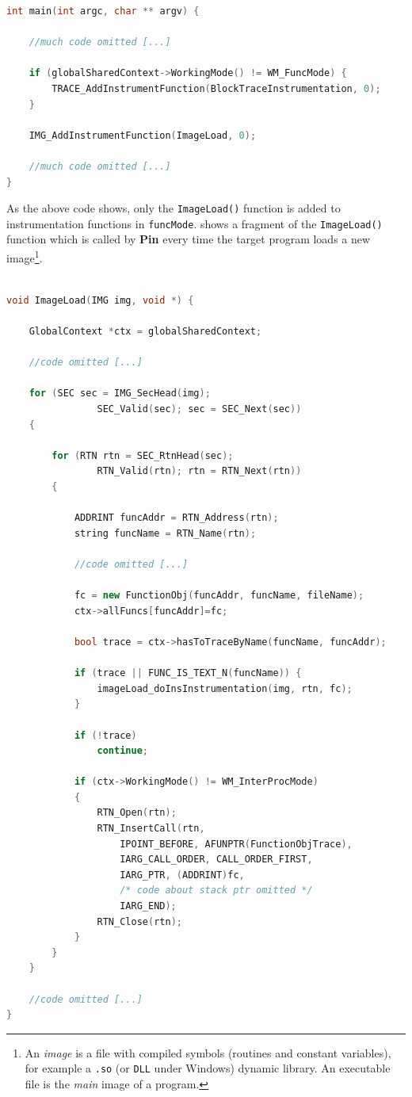 \documentclass[a4paper,10pt]{report}
\begin{document}
\begin{lstlisting}[language=C++, 
	caption={a fragment of main() routine}, 
	label=main1, frame=leftline]	
int main(int argc, char ** argv) {

	//much code omitted [...]

	if (globalSharedContext->WorkingMode() != WM_FuncMode) {
		TRACE_AddInstrumentFunction(BlockTraceInstrumentation, 0);
	}

	IMG_AddInstrumentFunction(ImageLoad, 0);

	//much code omitted [...]
}

\end{lstlisting}

As the above code shows, only the \verb|ImageLoad()| function is added to instrumentation
functions in \verb|funcMode|.
 shows a fragment of the \verb|ImageLoad()| function which
is called by \textbf{Pin} every time the target program loads a new 
image\footnote{An \emph{image} is a file with compiled symbols (routines and constant variables), for example a \texttt{.so} (or \texttt{DLL} under Windows) dynamic library.
An executable file is the \emph{main} image of a program.}.

\begin{lstlisting}[language=C++, 
	caption={a fragment of ImageLoad() routine}, 
	label=imgload, frame=leftline]	

void ImageLoad(IMG img, void *) {

	GlobalContext *ctx = globalSharedContext;
	
	//code omitted [...]

	for (SEC sec = IMG_SecHead(img); 
				SEC_Valid(sec); sec = SEC_Next(sec)) 
	{

		for (RTN rtn = SEC_RtnHead(sec); 
				RTN_Valid(rtn); rtn = RTN_Next(rtn)) 
		{
		
			ADDRINT funcAddr = RTN_Address(rtn);
			string funcName = RTN_Name(rtn);

			//code omitted [...]

			fc = new FunctionObj(funcAddr, funcName, fileName);
			ctx->allFuncs[funcAddr]=fc;		

			bool trace = ctx->hasToTraceByName(funcName, funcAddr);

			if (trace || FUNC_IS_TEXT_N(funcName)) {
				imageLoad_doInsInstrumentation(img, rtn, fc);
			}

			if (!trace)
				continue;

			if (ctx->WorkingMode() != WM_InterProcMode)
			{	
				RTN_Open(rtn);
				RTN_InsertCall(rtn, 
					IPOINT_BEFORE, AFUNPTR(FunctionObjTrace), 
					IARG_CALL_ORDER, CALL_ORDER_FIRST, 
					IARG_PTR, (ADDRINT)fc,  
					/* code about stack ptr omitted */
					IARG_END);
				RTN_Close(rtn);
			}			
		}
	}

	//code omitted [...]
}

\end{lstlisting}
\end{document}
